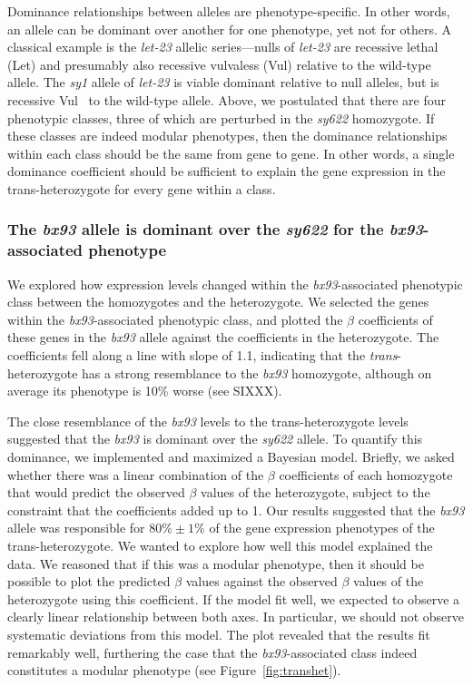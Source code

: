\documentclass[10pt, onecolumn]{article}
\newcommand{\gene}[1]{\mbox{\emph{#1}}}
\begin{document}
Dominance relationships between alleles are phenotype-specific. In other
words, an allele can be dominant over another for one phenotype, yet not for
others. A classical example is the \gene{let-23} allelic series---nulls of
\gene{let-23} are recessive lethal (Let) and presumably also recessive vulvaless
(Vul) relative to the wild-type allele. The \emph{sy1} allele of
\gene{let-23} is viable dominant relative to null alleles, but is recessive
Vul~\cite{} to the wild-type allele. Above, we postulated that there are four
phenotypic classes, three of which are perturbed in the \emph{sy622} homozygote.
If these classes are indeed modular phenotypes, then the dominance relationships
within each class should be the same from gene to gene. In other words, a single
dominance coefficient should be sufficient to explain the gene expression in the
trans-heterozygote for every gene within a class.

\subsubsection*{The \emph{bx93} allele is dominant over the \emph{sy622} for the
             \emph{bx93}-associated phenotype}

We explored how expression levels changed within the \emph{bx93}-associated
phenotypic class between the homozygotes and the heterozygote. We selected the
genes within the \emph{bx93}-associated phenotypic class, and plotted the
$\beta$ coefficients of these genes in the \emph{bx93} allele against the
coefficients in the heterozygote. The coefficients fell along a line with slope
of 1.1, indicating that the \emph{trans}-heterozygote has a strong resemblance
to the \emph{bx93} homozygote, although on average its phenotype is 10\% worse
(see SIXXX).

The close resemblance of the \emph{bx93} levels to the trans-heterozygote levels
suggested that the \emph{bx93} is dominant over the \emph{sy622} allele. To
quantify this dominance, we implemented and maximized a Bayesian model. Briefly,
we asked whether there was a linear combination of the $\beta$ coefficients of
each homozygote that would predict the observed $\beta$ values of the
heterozygote, subject to the constraint that the coefficients added up to 1. Our
results suggested that the \emph{bx93} allele was responsible for $80\% \pm 1\%$
of the gene expression phenotypes of the trans-heterozygote. We wanted to
explore how well this model explained the data. We reasoned that if this was a
modular phenotype, then it should be possible to plot the predicted $\beta$
values against the observed $\beta$ values of the heterozygote using this
coefficient. If the model fit well, we expected to observe a clearly linear
relationship between both axes. In particular, we should not observe systematic
deviations from this model. The plot revealed that the results fit remarkably
well, furthering the case that the \emph{bx93}-associated class indeed
constitutes a modular phenotype (see Figure~\ref{fig:transhet}).
\end{document}
